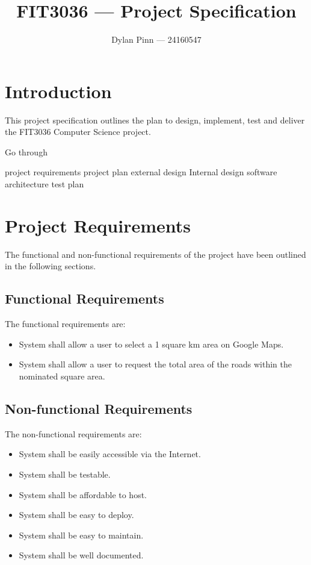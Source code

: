 \documentclass[a4paper,11pt]{article}
\begin{document}
\title{FIT3036 --- Project Specification}
\author{Dylan Pinn --- 24160547}
\maketitle
\pagebreak

\tableofcontents
\pagebreak

\section{Introduction}


This project specification outlines the plan to design, implement, test and
deliver the FIT3036 Computer Science project.

Go through

project requirements
project plan
external design
Internal design
software architecture
test plan

\section{Project Requirements}

The functional and non-functional requirements of the project have been outlined
in the following sections.

\subsection{Functional Requirements}

The functional requirements are:

\begin{itemize}
  \item System shall allow a user to select a 1 square km area on Google Maps.
  \item System shall allow a user to request the total area of the roads within
    the nominated square area.
\end{itemize}

\subsection{Non-functional Requirements}

The non-functional requirements are:

\begin{itemize}
  \item System shall be easily accessible via the Internet.
  \item System shall be testable.
  \item System shall be affordable to host.
  \item System shall be easy to deploy.
  \item System shall be easy to maintain.
  \item System shall be well documented.
\end{itemize}
\end{document}
